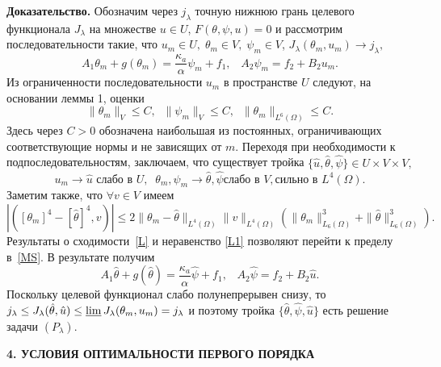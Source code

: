 \documentclass[12pt]{article}
\begin{document}
        {\bf Доказательство.}
    Обозначим через 
   $j_\lambda $ точную нижнюю грань целевого функционала $J_\lambda$
   на множестве $u \in U$, $F(\theta, \psi, u)=0$ и рассмотрим 
   последовательности такие, что
    $u_m \in U, \; \theta_m \in V, \;\psi_m\in V$, $J_\lambda(\theta_m, u_m)
    \rightarrow j_\lambda,$
    \begin{equation}
        \label{MS}
       A_1\theta_m+g(\theta_m)=\frac{\kappa_a}{\alpha}\psi_m+f_1,\;\;\; A_2\psi_m=f_2+B_2u_m.
    \end{equation}
    Из ограниченности последовательности $u_m$ в пространстве $U$ следуют, на основании
    леммы 1, оценки
    \[
        \|\theta_m\|_V \leq C,\;\;
        \|\psi_m\|_V \leq C,\;\;\|\theta_m\|_{L^6(\Omega)} \leq C.
    \]
    Здесь через $C>0$ обозначена наибольшая из постоянных, ограничивающих соответствующие нормы и не зависящих от $m$.
    Переходя при необходимости к подпоследовательностям, заключаем, что
    существует тройка $\{ \hat{u}, \hat{\theta}, \hat{\psi} \} \in U \times V \times V,$
    \begin{equation}
        \label{L}
        u_m \rightarrow \hat{u} \text{  слабо в } U, \;\;
        \theta_m, \psi_m \rightarrow \hat{\theta}, \hat{\psi} \text{
            слабо в } V, \text{
            сильно в } L^4(\Omega).
    \end{equation}
    Заметим также, что $\forall v \in V$ имеем
    \begin{equation}
        \label{L1}
        |( [\theta_m]^4 - [\hat{\theta}]^4, v)|
        \leq 2 \| \theta_m - \hat{\theta}\|_{L^4(\Omega)} \|v\|_{L^4(\Omega)}
        \left( \| \theta_m \|^3_{L_6(\Omega)} + \| \hat{\theta} \|^3_{L_6(\Omega)}\right).
    \end{equation}
    Результаты о сходимости~\eqref{L} и неравенство \eqref{L1} позволяют перейти
    к пределу в~\eqref{MS}. В результате получим
  \begin{equation}\label{w1}
        A_1 \hat{\theta} + g(\hat{\theta}) = \frac{\kappa_a}{\alpha}\hat{\psi}+f_1,\;\;\; A_2\hat{\psi}=f_2+B_2\hat{u}.
        \end{equation}    
 Поскольку целевой функционал слабо полунепрерывен снизу, то   $j_\lambda \leq J_\lambda(\hat{\theta}, \hat{u}) \leq \varliminf J_\lambda(\theta_m, u_m) =
    j_\lambda$ и поэтому
    тройка $\{\hat{\theta}, \hat{\psi}, \hat{u} \}$ есть
    решение задачи $(P_\lambda).$

    \begin{center}
        \textbf{4. УСЛОВИЯ ОПТИМАЛЬНОСТИ ПЕРВОГО ПОРЯДКА}
    \end{center}
\end{document}
